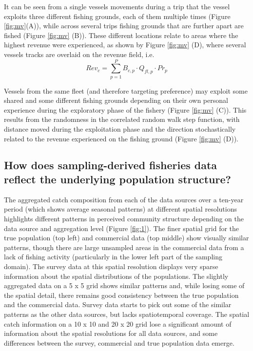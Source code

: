 \documentclass[review]{elsarticle}
\begin{document}
It can be seen from a single vessels movements during a trip that the vessel
exploits three different fishing grounds, each of them multiple times (Figure
\ref{fig:mv}(A)), while across several trips fishing grounds that are further
apart are fished (Figure \ref{fig:mv} (B)). These different locations relate to
areas where the highest revenue were experienced, as shown by Figure
\ref{fig:mv} (D), where several vessels tracks are overlaid on the revenue
field, i.e. $$Rev_{c} = \sum^P_{p=1} B_{c,p} \cdot Q_{fl,p} \cdot Pr_{p}$$

Vessels from the same fleet (and therefore targeting preference) may exploit
some shared and some different fishing grounds depending on their own personal
experience during the exploratory phase of the fishery (Figure \ref{fig:mv} (C)).
This results from the randomness in the correlated random walk step function,
with distance moved during the exploitation phase and the direction
stochastically related to the revenue experienced on the fishing ground (Figure
\ref{fig:mv} (D)). 

\subsection{How does sampling-derived fisheries data reflect the underlying
	population structure?}

The aggregated catch composition from each of the data sources over a ten-year
period (which shows average seasonal patterns) at different spatial resolutions
highlights different patterns in perceived community structure depending on the
data source and aggregation level (Figure \ref{fig:1}). The finer spatial grid
for the true population (top left) and commercial data (top middle) show
visually similar patterns, though there are large unsampled areas in the
commercial data from a lack of fishing activity (particularly in the lower left
part of the sampling domain). The survey data at this spatial resolution
displays very sparse information about the spatial distributions of the
populations. The slightly aggregated data on a 5 x 5 grid shows similar
patterns and, while losing some of the spatial detail, there remains good
consistency between the true population and the commercial data. Survey data
starts to pick out some of the similar patterns as the other data sources, but
lacks spatiotemporal coverage. The spatial catch information on a 10 x 10 and
20 x 20 grid lose a significant amount of information about the spatial
resolutions for all data sources, and some differences between the survey,
commercial and true population data emerge. \\
\end{document}
